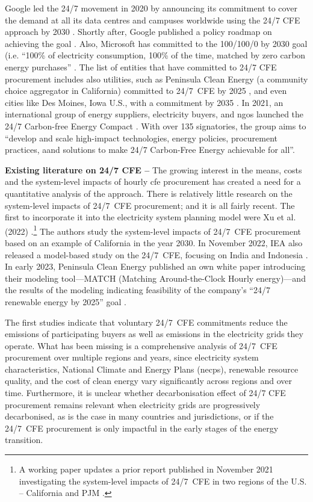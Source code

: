 Google led the 24/7 movement in 2020 by announcing its commitment to cover the demand at all its data centres and campuses worldwide using the 24/7 CFE approach by 2030 \cite{google-247by2030}.
Shortly after, Google published a policy roadmap on achieving the goal \cite{google-PolicyRoadmap}.
Also, Microsoft has committed to the 100/100/0 by 2030 goal (i.e. \enquote{100\% of electricity consumption, 100\% of the time, matched by zero carbon energy purchases} \cite{Microsoft-vision}. 
The list of entities that have committed to 24/7 CFE procurement includes also utilities, such as Peninsula Clean Energy (a community choice aggregator in California) committed to 24/7~CFE by 2025 \cite{peninsula-OurPathto247}, and even cities like Des Moines, Iowa U.S., with a commitment by 2035 \cite{iowaenvcouncil-247}. In 2021, an international group of energy suppliers, electricity buyers, and \gls{ngo}s launched the 24/7 Carbon-free Energy Compact \cite{gocarbonfree247}.
With over 135 signatories, the group aims to \enquote{develop and scale high-impact technologies, energy policies, procurement practices, aand solutions to make 24/7 Carbon-Free Energy achievable for all}.


\textbf{Existing literature on 24/7 CFE --} The growing interest in the means, costs and the system-level impacts of hourly \gls{cfe} procurement has created a need for a quantitative analysis of the approach.
There is relatively little research on the system-level impacts of 24/7~CFE procurement; and it is all fairly recent.
The first to incorporate it into the electricity system planning model were Xu et al. (2022) \cite{xu-247CFE-SSRN}.\footnote{A working paper updates a prior report published in November 2021 investigating the system-level impacts of 24/7~CFE in two regions of the U.S. -- California and PJM \cite{xu-247CFE-report}.} 
The authors study the system-level impacts of 24/7~CFE procurement based on an example of California in the year 2030.
In November 2022, IEA also released a model-based study on the 24/7~CFE, focusing on India and Indonesia \cite{ieaAdvancingDecarbonisationClean2022}.
In early 2023, Peninsula Clean Energy published an own white paper introducing their modeling tool---MATCH (Matching Around-the-Clock Hourly energy)---and the results of the modeling indicating feasibility of the company's \enquote{24/7 renewable energy by 2025} goal \cite{peninsula-report247}.

The first studies indicate that voluntary 24/7~CFE commitments reduce the emissions of participating buyers as well as emissions in the electricity grids they operate.
What has been missing is a comprehensive analysis of 24/7~CFE procurement over multiple regions and years, since electricity system characteristics, National Climate and Energy Plans (\gls{necp}s), renewable resource quality, and the cost of clean energy vary significantly across regions and over time.
Furthermore, it is unclear whether decarbonisation effect of 24/7 CFE procurement remains relevant when electricity grids are progressively decarbonised, as is the case in many countries and jurisdictions, or if the 24/7~CFE procurement is only impactful in the early stages of the energy transition.

